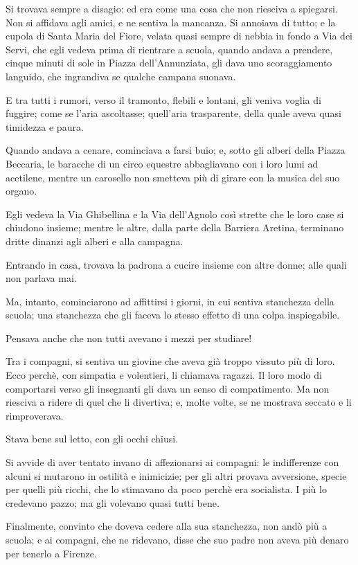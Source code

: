 Si trovava sempre a disagio: ed era come una cosa che non riesciva a spiegarsi. Non si affidava agli amici, e ne sentiva la mancanza. Si annoiava di tutto; e la cupola di Santa Maria del Fiore, velata quasi sempre di nebbia in fondo a Via dei Servi, che egli vedeva prima di rientrare a scuola, quando andava a prendere, cinque minuti di sole in Piazza dell'Annunziata, gli dava uno scoraggiamento languido, che ingrandiva se qualche campana suonava.

E tra tutti i rumori, verso il tramonto, flebili e lontani, gli veniva voglia di fuggire; come se l’aria ascoltasse; quell’aria trasparente, della quale aveva quasi timidezza e paura.

Quando andava a cenare, cominciava a farsi buio; e, sotto gli alberi della Piazza Beccaria, le baracche di un circo equestre abbagliavano con i loro lumi ad acetilene, mentre un carosello non smetteva più di girare con la musica del suo organo.

Egli vedeva la Via Ghibellina e la Via dell’Agnolo così strette che le loro case si chiudono insieme; mentre le altre, dalla parte della Barriera Aretina, terminano dritte dinanzi agli alberi e alla campagna.

Entrando in casa, trovava la padrona a cucire insieme con altre donne; alle quali non parlava mai.

Ma, intanto, cominciarono ad affittirsi i giorni, in cui sentiva stanchezza della scuola; una stanchezza che gli faceva lo stesso effetto di una colpa inspiegabile.

Pensava anche che non tutti avevano i mezzi per studiare!

Tra i compagni, si sentiva un giovine che aveva già troppo vissuto più di loro. Ecco perchè, con simpatia e volentieri, li chiamava ragazzi. Il loro modo di comportarsi verso gli insegnanti gli dava un senso di compatimento. Ma non riesciva a ridere di quel che li divertiva; e, molte volte, se ne mostrava seccato e li rimproverava.

Stava bene sul letto, con gli occhi chiusi.

Si avvide di aver tentato invano di affezionarsi ai compagni: le indifferenze con alcuni si mutarono in ostilità e inimicizie; per gli altri provava avversione, specie per quelli più ricchi, che lo stimavano da poco perchè era socialista. I più lo credevano pazzo; ma gli volevano quasi tutti bene.

Finalmente, convinto che doveva cedere alla sua stanchezza, non andò più a scuola; e ai compagni, che ne ridevano, disse che suo padre non aveva più denaro per tenerlo a Firenze.

